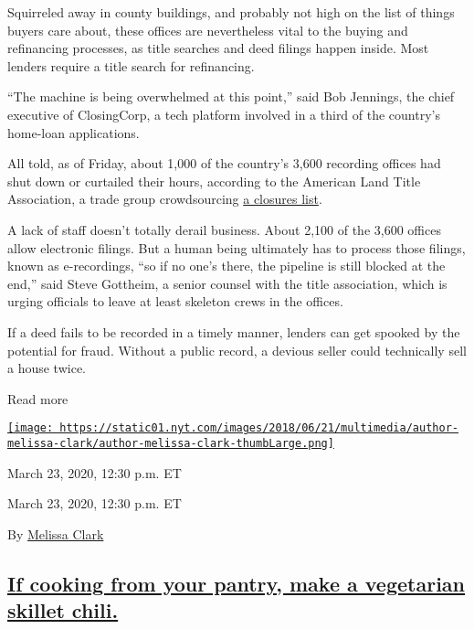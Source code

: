 Squirreled away in county buildings, and probably not high on the list
of things buyers care about, these offices are nevertheless vital to the
buying and refinancing processes, as title searches and deed filings
happen inside. Most lenders require a title search for refinancing.

``The machine is being overwhelmed at this point,'' said Bob Jennings,
the chief executive of ClosingCorp, a tech platform involved in a third
of the country's home-loan applications.

All told, as of Friday, about 1,000 of the country's 3,600 recording
offices had shut down or curtailed their hours, according to the
American Land Title Association, a trade group crowdsourcing
\href{https://www.alta.org/business-tools/coronavirus.cfm}{a closures
list}.

A lack of staff doesn't totally derail business. About 2,100 of the
3,600 offices allow electronic filings. But a human being ultimately has
to process those filings, known as e-recordings, ``so if no one's there,
the pipeline is still blocked at the end,'' said Steve Gottheim, a
senior counsel with the title association, which is urging officials to
leave at least skeleton crews in the offices.

If a deed fails to be recorded in a timely manner, lenders can get
spooked by the potential for fraud. Without a public record, a devious
seller could technically sell a house twice.

Read more

\href{https://www.nytimes.com/by/melissa-clark}{\texttt{[image: https://static01.nyt.com/images/2018/06/21/multimedia/author-melissa-clark/author-melissa-clark-thumbLarge.png]}}

March 23, 2020, 12:30 p.m. ET

March 23, 2020, 12:30 p.m. ET

By \href{https://www.nytimes.com/by/melissa-clark}{Melissa Clark}

\hypertarget{if-cooking-from-your-pantry-make-a-vegetarian-skillet-chili}{%
\subsection{\texorpdfstring{\protect\hyperlink{if-cooking-from-your-pantry-make-a-vegetarian-skillet-chili}{If
cooking from your pantry, make a vegetarian skillet
chili.}}{If cooking from your pantry, make a vegetarian skillet chili.}}\label{if-cooking-from-your-pantry-make-a-vegetarian-skillet-chili}}

